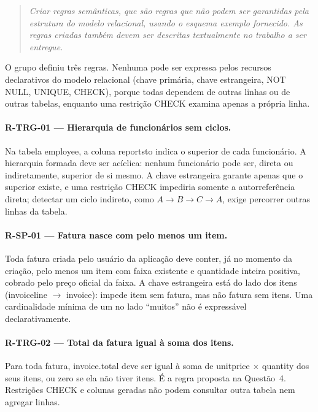 \documentclass[11pt,a4paper]{article}
\newcommand{\cod}[1]{{\ttfamily\renewcommand{\_}{\textunderscore\allowbreak}#1}}
\newenvironment{enunciado}{\begin{quote}\small\itshape}{\end{quote}}
\begin{document}
\begin{enunciado}
Criar regras semânticas, que são regras que não podem ser garantidas pela estrutura do modelo relacional, usando
o esquema exemplo fornecido. As regras criadas também devem ser descritas textualmente no trabalho a ser
entregue.
\end{enunciado}

O grupo definiu três regras. Nenhuma pode ser expressa pelos recursos declarativos do modelo relacional (chave
primária, chave estrangeira, \cod{NOT NULL}, \cod{UNIQUE}, \cod{CHECK}), porque todas dependem de outras linhas
ou de outras tabelas, enquanto uma restrição \cod{CHECK} examina apenas a própria linha.

\paragraph{R-TRG-01 --- Hierarquia de funcionários sem ciclos.} Na tabela \cod{employee}, a coluna
\cod{reports\_to} indica o superior de cada funcionário. A hierarquia formada deve ser acíclica: nenhum
funcionário pode ser, direta ou indiretamente, superior de si mesmo. A chave estrangeira garante apenas que o
superior existe, e uma restrição \cod{CHECK} impediria somente a autorreferência direta; detectar um ciclo
indireto, como $A \rightarrow B \rightarrow C \rightarrow A$, exige percorrer outras linhas da tabela.

\paragraph{R-SP-01 --- Fatura nasce com pelo menos um item.} Toda fatura criada pelo usuário da aplicação deve
conter, já no momento da criação, pelo menos um item com faixa existente e quantidade inteira positiva, cobrado
pelo preço oficial da faixa. A chave estrangeira está do lado dos itens (\cod{invoice\_line} $\rightarrow$
\cod{invoice}): impede item sem fatura, mas não fatura sem itens. Uma cardinalidade mínima de um no lado
``muitos'' não é expressável declarativamente.

\paragraph{R-TRG-02 --- Total da fatura igual à soma dos itens.} Para toda fatura, \cod{invoice.total} deve ser
igual à soma de \cod{unit\_price} $\times$ \cod{quantity} dos seus itens, ou zero se ela não tiver itens. É a regra
proposta na Questão~4. Restrições \cod{CHECK} e colunas geradas não podem consultar outra tabela nem agregar
linhas.
\end{document}
